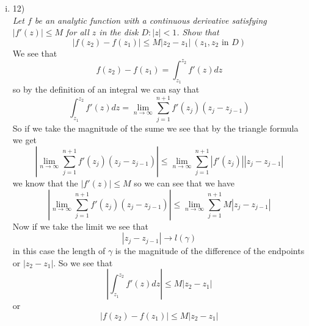 \documentclass[11pt]{article}
\begin{document}
\begin{enumerate}
\begin{enumerate}[(i)]
\item 12)\\
\textit{Let $f$ be an analytic function with a continuous derivative satisfying $|f'(z)|\le M$ for all $z$ in the disk $D:|z|<1$. Show that}
$$|f(z_2) - f(z_1)|\le M|z_2-z_1|\ (z_1,z_2 \mbox{ in } D)$$
We see that 
$$f(z_2)-f(z_1) = \int_{z_1}^{z_2} f'(z)dz$$
so by the definition of an integral we can say that
$$\int_{z_1}^{z_2} f'(z)dz = \lim_{n\rightarrow\infty} \sum_{j=1}^{n+1}f'(z_j)(z_j-z_{j-1})$$
So if we take the magnitude of the sume we see that by the triangle formula we get
$$\left|\lim_{n\rightarrow\infty} \sum_{j=1}^{n+1}f'(z_j)(z_j-z_{j-1})\right|\le\lim_{n\rightarrow\infty} \sum_{j=1}^{n+1}\left|f'(z_j)\right|\left|z_j-z_{j-1}\right|$$
we know that the $|f'(z)|\le M$ so we can see that we have
$$\left|\lim_{n\rightarrow\infty} \sum_{j=1}^{n+1}f'(z_j)(z_j-z_{j-1})\right|\le\lim_{n\rightarrow\infty} \sum_{j=1}^{n+1}M\left|z_j-z_{j-1}\right|$$
Now if we take the limit we see that 
$$|z_j-z_{j-1}| \rightarrow l(\gamma)$$
in this case the length of $\gamma$ is the magnitude of the difference of the endpoints or $|z_2-z_1|$. So we see that
$$\left|\int_{z_1}^{z_2} f'(z)dz\right|\le M\left|z_2-z_{1}\right|$$
or 
$$|f(z_2) - f(z_1)|\le M|z_2-z_1|$$
\end{enumerate}
\end{enumerate}
\end{document}
